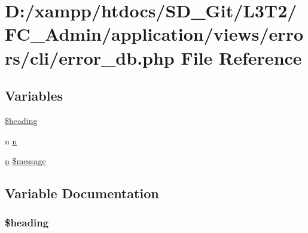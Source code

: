 \hypertarget{_admin_2application_2views_2errors_2cli_2error__db_8php}{}\section{D\+:/xampp/htdocs/\+S\+D\+\_\+\+Git/\+L3\+T2/\+F\+C\+\_\+\+Admin/application/views/errors/cli/error\+\_\+db.php File Reference}
\label{_admin_2application_2views_2errors_2cli_2error__db_8php}
\subsection*{Variables}
\begin{DoxyCompactItemize}
\item 
\hyperlink{_admin_2application_2views_2errors_2cli_2error__db_8php_a196169be7715d466e3310388b096598c}{\$heading}
\item 
n \hyperlink{_admin_2application_2views_2errors_2cli_2error__db_8php_ace0fd03cd383f20ce6ea63247a207294}{n}
\item 
\hyperlink{_admin_2application_2views_2errors_2cli_2error__general_8php_ace0fd03cd383f20ce6ea63247a207294}{n} \hyperlink{_admin_2application_2views_2errors_2cli_2error__db_8php_aaba2b6aee423b3b5e46000f90b4c8c7f}{\$message}
\end{DoxyCompactItemize}


\subsection{Variable Documentation}
\hypertarget{_admin_2application_2views_2errors_2cli_2error__db_8php_a196169be7715d466e3310388b096598c}{}
\subsubsection[{\$heading}]{\setlength{\rightskip}{0pt plus 5cm}\$heading}\label{_admin_2application_2views_2errors_2cli_2error__db_8php_a196169be7715d466e3310388b096598c}
\hypertarget{_admin_2application_2views_2errors_2cli_2error__db_8php_aaba2b6aee423b3b5e46000f90b4c8c7f}{}
